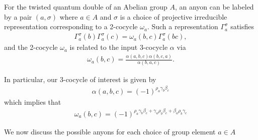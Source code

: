 \documentclass[nofootinbib,pra,twocolumn,showpacs,superscriptaddress,notitlepage,amsmath]{revtex4-2} %
\begin{document}
 For the twisted quantum double of an Abelian group $A$, an anyon can be labeled by a pair $(a,\sigma)$ where $a \in A$ and $\sigma$ is a choice of projective irreducible representation corresponding to a 2-cocycle $\omega_a$. Such a representation $\Gamma^\sigma_{a}$ satisfies
\begin{align}
    \Gamma^\sigma_{a}(b) \Gamma^\sigma_{a}(c) = \omega_a(b,c)  \Gamma^\sigma_a(bc),
    \label{eq:Gammaprojective}
\end{align}
 and the 2-cocycle $\omega_a$ is related to the input 3-cocycle $\alpha$ via
 \begin{align}
     \omega_a(b,c) =\frac{\alpha(a,b,c)\alpha(b,c,a)}{\alpha(b,a,c)}.
 \end{align}

In particular, our 3-cocycle of interest is given by
\begin{align}
    \alpha(a,b,c) = (-1)^{\rho_a\gamma_b\beta_c}
\end{align}
which implies that
\begin{align}
    \omega_a(b,c) = (-1)^{\rho_a\gamma_b\beta_c + \gamma_a\rho_b\beta_c + \beta_a\rho_b\gamma_c }
\end{align}

We now discuss the possible anyons for each choice of group element $a\in A$
\end{document}
